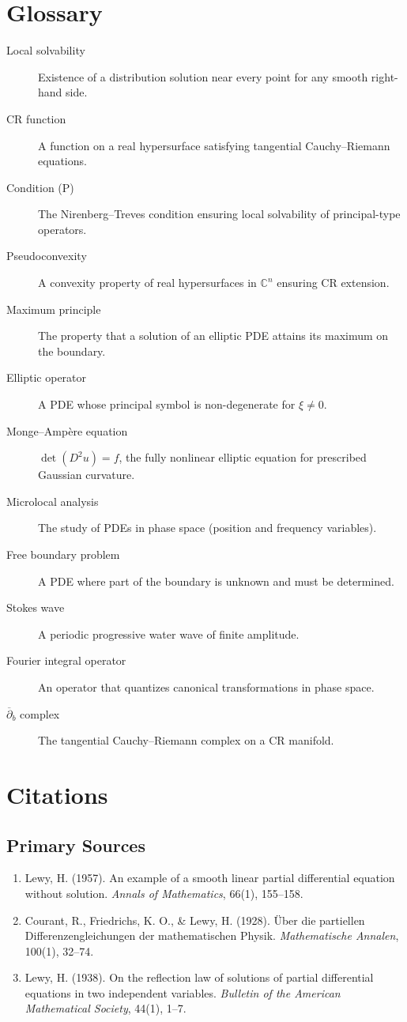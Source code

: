 \section*{Glossary}
\begin{description}
    \item[Local solvability] Existence of a distribution solution near every point for any smooth right-hand side.
    \item[CR function] A function on a real hypersurface satisfying tangential Cauchy--Riemann equations.
    \item[Condition (P)] The Nirenberg--Treves condition ensuring local solvability of principal-type operators.
    \item[Pseudoconvexity] A convexity property of real hypersurfaces in $\mathbb{C}^n$ ensuring CR extension.
    \item[Maximum principle] The property that a solution of an elliptic PDE attains its maximum on the boundary.
    \item[Elliptic operator] A PDE whose principal symbol is non-degenerate for $\xi \neq 0$.
    \item[Monge--Amp\`{e}re equation] $\det(D^2 u) = f$, the fully nonlinear elliptic equation for prescribed Gaussian curvature.
    \item[Microlocal analysis] The study of PDEs in phase space (position and frequency variables).
    \item[Free boundary problem] A PDE where part of the boundary is unknown and must be determined.
    \item[Stokes wave] A periodic progressive water wave of finite amplitude.
    \item[Fourier integral operator] An operator that quantizes canonical transformations in phase space.
    \item[$\overline{\partial}_b$ complex] The tangential Cauchy--Riemann complex on a CR manifold.
\end{description}

\section{Citations}

\subsection*{Primary Sources}
\begin{enumerate}
    \item Lewy, H. (1957). An example of a smooth linear partial differential equation without solution. \textit{Annals of Mathematics}, 66(1), 155--158.
    \item Courant, R., Friedrichs, K. O., \& Lewy, H. (1928). Über die partiellen Differenzengleichungen der mathematischen Physik. \textit{Mathematische Annalen}, 100(1), 32--74.
    \item Lewy, H. (1938). On the reflection law of solutions of partial differential equations in two independent variables. \textit{Bulletin of the American Mathematical Society}, 44(1), 1--7.
\end{enumerate}

